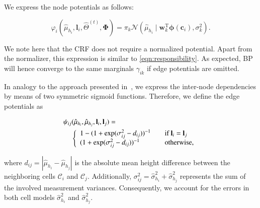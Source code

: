 We express the node potentials as follows:

\begin{equation}
\label{eqn:node_potential}
\varphi_i(\hat{\mu}_{h_i},\mathbf{l}_i,\hat{\Theta}^{(t)},\boldsymbol{\Phi})=
\pi_k\mathcal{N}(\hat{\mu}_{h_i}\mid\mathbf{w}_k^\text{T}
\boldsymbol{\phi}(\mathbf{c}_i),\sigma^2_k).
\end{equation}

We note here that the CRF does not require a normalized potential. Apart from
the normalizer, this expression is similar to \eqref{eqn:responsibility}. As
expected, BP will hence converge to the same marginals $\gamma_{ik}$ if edge
potentials are omitted.

In analogy to the approach presented in~\cite{siegemund10curb}, we express the
inter-node dependencies by means of two symmetric sigmoid functions. Therefore,
we define the edge potentials as

\begin{eqnarray}
\label{eqn:edge_potential}
\psi_{ij}(\hat{\mu}_{h_i},\hat{\mu}_{h_j},\mathbf{l}_i,\mathbf{l}_j)=
\phantom{aaaaaaaaaaaaaaaaaaaaaaa}\\\nonumber
\left\{
\begin{array}{l l}
1-(1+\exp(\sigma^2_{ij}-d_{ij}))^{-1} & \quad
\text{if $\mathbf{l}_i=\mathbf{l}_j$}\\
(1+\exp(\sigma^2_{ij}-d_{ij}))^{-1} & \quad
\text{otherwise},
\end{array} \right.
\end{eqnarray}

where $d_{ij}=|\hat{\mu}_{h_i}-\hat{\mu}_{h_j}|$ is the absolute mean height
difference between the neighboring cells $\mathcal{C}_i$ and $\mathcal{C}_j$.
Additionally, $\sigma^2_{ij}=\hat{\sigma}^2_{h_i}+\hat{\sigma}^2_{h_j}$
represents the sum of the involved measurement variances. Consequently, we
account for the errors in both cell models $\hat{\sigma}^2_{h_i}$ and
$\hat{\sigma}^2_{h_j}$.
